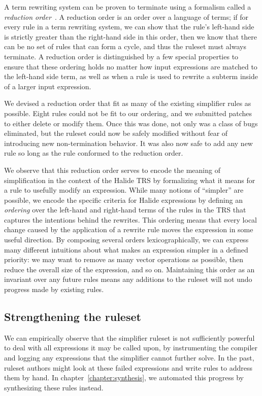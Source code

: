 A term rewriting system can be proven to terminate using a formalism called a \emph{reduction order}~\citep{baader1999term}. A reduction order is an order over a language of terms; if for every rule in a term rewriting system, we can show that the rule's left-hand side is strictly greater than the right-hand side in this order, then we know that there can be no set of rules that can form a cycle, and thus the ruleset must always terminate. A reduction order is distinguished by a few special properties to ensure that these ordering holds no matter how input expressions are matched to the left-hand side term, as well as when a rule is used to rewrite a subterm inside of a larger input expression.

We devised a reduction order that fit as many of the existing simplifier rules as possible. Eight rules could not be fit to our ordering, and we submitted patches to either delete or modify them. Once this was done, not only was a class of bugs eliminated, but the ruleset could now be safely modified without fear of introducing new non-termination behavior. It was also now safe to add any new rule so long as the rule conformed to the reduction order. 

We observe that this reduction order serves to encode the meaning of simplification in the context of the Halide TRS
by formalizing what it means for a rule to usefully modify an expression.  While
many notions of ``simpler'' are possible, we encode the specific criteria for Halide
expressions by defining an \emph{ordering} over the left-hand and right-hand terms of 
the rules in the TRS that captures the intentions behind the rewrites. This ordering 
means that every local change caused by the application of a rewrite rule moves the 
expression in some useful direction. By composing several orders lexicographically, 
we can express many different intuitions about what makes an expression simpler in a
defined priority: we may want to remove as many vector operations as possible, 
then reduce the overall size of the expression, and so on. Maintaining this order as 
an invariant over any future rules means any additions to the ruleset will not undo 
progress made by existing rules.

\subsection{Strengthening the ruleset}
We can empirically observe that the simplifier ruleset is not sufficiently powerful to deal with all expressions it may be called upon, by instrumenting the compiler and logging any expressions that the simplifier cannot further solve. In the past, ruleset authors might look at these failed expressions and write rules to address them by hand. In chapter~\ref{chapter:synthesis}, we automated this progress by synthesizing these rules instead.

